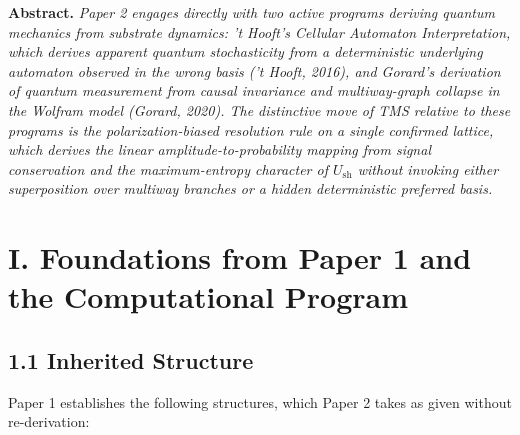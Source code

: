 \documentclass[11pt,oneside]{report}
\theoremstyle{definition}
\theoremstyle{remark}
\newenvironment{paperabstract}
  {\begin{center}\begin{minipage}{0.88\textwidth}\small
   \noindent\textbf{Abstract.}\itshape\space}
  {\end{minipage}\end{center}\vspace{0.4em}}
\begin{document}
\begin{paperabstract}
Paper 2 engages directly with two active programs deriving quantum
mechanics from substrate dynamics: 't Hooft's Cellular Automaton
Interpretation, which derives apparent quantum stochasticity from a
deterministic underlying automaton observed in the wrong basis ('t
Hooft, 2016), and Gorard's derivation of quantum measurement from causal
invariance and multiway-graph collapse in the Wolfram model (Gorard,
2020). The distinctive move of TMS relative to these programs is the
polarization-biased resolution rule on a single confirmed lattice, which
derives the linear amplitude-to-probability mapping from signal
conservation and the maximum-entropy character of \ensuremath{U_{\mathrm{sh}}} without invoking
either superposition over multiway branches or a hidden deterministic
preferred basis.
\end{paperabstract}

\section*{I. Foundations from Paper 1 and the Computational Program}

\subsection*{1.1 Inherited Structure}

Paper 1 establishes the following structures, which Paper 2 takes as
given without re-derivation:
\end{document}
